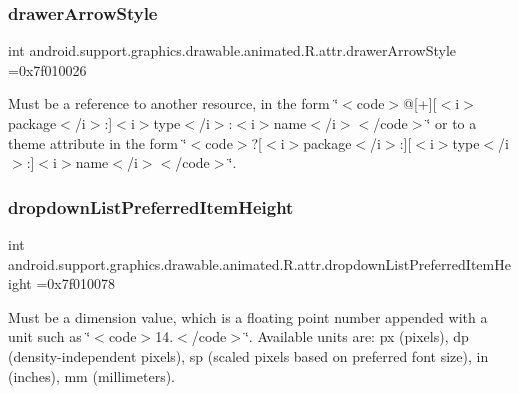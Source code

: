 \subsubsection{\texorpdfstring{drawer\+Arrow\+Style}{drawerArrowStyle}}
{\footnotesize\ttfamily int android.\+support.\+graphics.\+drawable.\+animated.\+R.\+attr.\+drawer\+Arrow\+Style =0x7f010026\hspace{0.3cm}{\ttfamily [static]}}

Must be a reference to another resource, in the form \char`\"{}$<$code$>$@\mbox{[}+\mbox{]}\mbox{[}$<$i$>$package$<$/i$>$\+:\mbox{]}$<$i$>$type$<$/i$>$\+:$<$i$>$name$<$/i$>$$<$/code$>$\char`\"{} or to a theme attribute in the form \char`\"{}$<$code$>$?\mbox{[}$<$i$>$package$<$/i$>$\+:\mbox{]}\mbox{[}$<$i$>$type$<$/i$>$\+:\mbox{]}$<$i$>$name$<$/i$>$$<$/code$>$\char`\"{}. \mbox{\label{classandroid_1_1support_1_1graphics_1_1drawable_1_1animated_1_1R_1_1attr_a63605f410c43b88afaf4d74ee7357f8d}} 
\subsubsection{\texorpdfstring{dropdown\+List\+Preferred\+Item\+Height}{dropdownListPreferredItemHeight}}
{\footnotesize\ttfamily int android.\+support.\+graphics.\+drawable.\+animated.\+R.\+attr.\+dropdown\+List\+Preferred\+Item\+Height =0x7f010078\hspace{0.3cm}{\ttfamily [static]}}

Must be a dimension value, which is a floating point number appended with a unit such as \char`\"{}$<$code$>$14.\+5sp$<$/code$>$\char`\"{}. Available units are\+: px (pixels), dp (density-\/independent pixels), sp (scaled pixels based on preferred font size), in (inches), mm (millimeters). 

